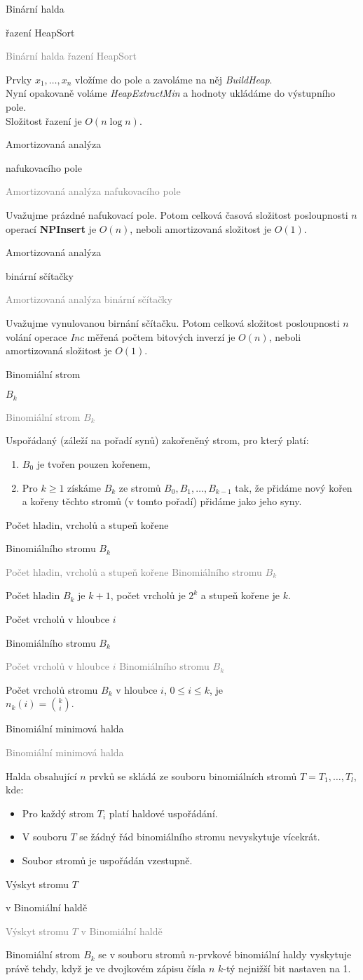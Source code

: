 \documentclass[20pt]{extarticle}
\newcommand{\card}[3][]{
	\vspace*{\fill}

	\newpage
	\topskip0pt
	\vspace*{\fill}
		\Large #2

		\vspace{1cm}
		\normalsize #1
	\vspace*{\fill}
	\newpage

	\small \textcolor{gray}{#2 #1}
	\topskip0pt
	\vspace*{\fill}

	\normalsize
	#3
	\vspace*{\fill}
}
\begin{document}
\begin{center}
\card[řazení HeapSort]{Binární halda}{
	Prvky $x_1, \dots, x_n$ vložíme do pole a zavoláme na něj \textit{BuildHeap}.\\
	Nyní opakovaně voláme \textit{HeapExtractMin} a hodnoty ukládáme do výstupního pole.\\
	Složitost řazení je $O(n \log n)$.
}

\card[nafukovacího pole]{Amortizovaná analýza}{
	Uvažujme prázdné nafukovací pole. Potom celková časová složitost posloupnosti
	$n$ operací \textbf{NPInsert} je $O(n)$, neboli amortizovaná složitost je $O(1)$.
}

\card[binární sčítačky]{Amortizovaná analýza}{
	Uvažujme vynulovanou birnání sčítačku. Potom celková složitost posloupnosti
	$n$ volání operace \textit{Inc} měřená počtem bitových inverzí je $O(n)$,
	neboli amortizovaná složitost je $O(1)$.
}

\card[$B_k$]{Binomiální strom}{
	Uspořádaný (záleží na pořadí synů) zakořeněný strom, pro který platí:
	\begin{enumerate}
		\item $B_0$ je tvořen pouzen kořenem,
		\item Pro $k \geq 1$ získáme $B_k$ ze stromů $B_0, B_1, \dots, B_{k-1}$ tak,
		že přidáme nový kořen a kořeny těchto stromů (v tomto pořadí) přidáme jako jeho syny.
	\end{enumerate}
}

\card[Binomiálního stromu $B_k$]{Počet hladin, vrcholů a stupeň kořene}{
	Počet hladin $B_k$ je $k+1$, počet vrcholů je $2^k$ a stupeň kořene je $k$.
}

\card[Binomiálního stromu $B_k$]{Počet vrcholů v hloubce $i$}{
	Počet vrcholů stromu $B_k$ v hloubce $i$, $0 \leq i \leq k$, je\\
	$n_k(i)=\binom{k}{i}$.
}

\card{Binomiální minimová halda}{
	\small
	Halda obsahující $n$ prvků se skládá ze souboru binomiálních stromů
	$T=T_1, \dots, T_l$, kde:\\
	\begin{itemize}
		\item Pro každý strom $T_i$ platí haldové uspořádání.
		\item V souboru $T$ se žádný řád binomiálního stromu nevyskytuje vícekrát.
		\item Soubor stromů je uspořádán vzestupně.
	\end{itemize}
	\normalsize
}

\card[v Binomiální haldě]{Výskyt stromu $T$}{
	Binomiální strom $B_k$ se v souboru stromů $n$-prvkové binomiální haldy vyskytuje
	právě tehdy, když je ve dvojkovém zápisu čísla $n$ $k$-tý nejnižší bit
	nastaven na 1.
}


\end{center}
\end{document}

